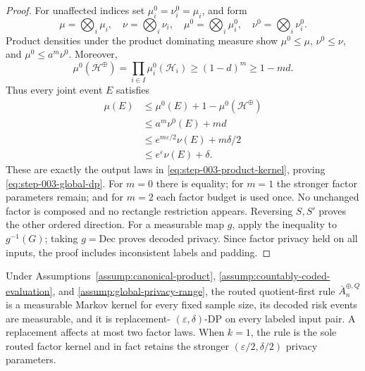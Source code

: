 \begin{proof}
For unaffected indices set \(\mu_i^0=\nu_i^0=\mu_i\), and form
\begin{equation}\label{eq:step-003-product-submeasures}
\mu=\bigotimes_i\mu_i,\quad \nu=\bigotimes_i\nu_i,\quad
\mu^0=\bigotimes_i\mu_i^0,\quad \nu^0=\bigotimes_i\nu_i^0.
\end{equation}
Product densities under the product dominating measure show
\(\mu^0\le\mu\), \(\nu^0\le\nu\), and
\(\mu^0\le a^m\nu^0\).  Moreover,
\begin{equation}\label{eq:step-003-product-retained-mass}
\mu^0(\mathcal H^{\oplus})
=\prod_{i\in I}\mu_i^0(\mathcal H_i)
\ge(1-d)^m\ge1-md.
\end{equation}
Thus every joint event \(E\) satisfies
\begin{equation}\label{eq:step-003-composition-chain}
\begin{split}
\mu(E)
&\le\mu^0(E)+1-\mu^0(\mathcal H^{\oplus})\\
&\le a^m\nu^0(E)+md\\
&\le e^{m\varepsilon/2}\nu(E)+m\delta/2\\
&\le e^\varepsilon\nu(E)+\delta.
\end{split}
\end{equation}
These are exactly the output laws in
\eqref{eq:step-003-product-kernel}, proving
\eqref{eq:step-003-global-dp}.  For \(m=0\) there is equality; for \(m=1\)
the stronger factor parameters remain; and for \(m=2\) each factor budget
is used once.  No unchanged factor is composed and no rectangle restriction
appears.  Reversing \(S,S'\) proves the other ordered direction.  For a
measurable map \(g\), apply the inequality to \(g^{-1}(G)\); taking
\(g=\mathrm{Dec}\) proves decoded privacy.  Since factor privacy held on all
inputs, the proof includes inconsistent labels and padding.
\end{proof}

\begin{proposition}
\label{prop:step-003-global-kernel-certificate}
Under Assumptions~\ref{assump:canonical-product},
\ref{assump:countably-coded-evaluation}, and
\ref{assump:global-privacy-range}, the routed quotient-first rule
\(\bar A_n^{\oplus,Q}\) is a measurable Markov kernel for every fixed
sample size, its decoded risk events are measurable, and it is replacement-
\((\varepsilon,\delta)\)-DP on every labeled input pair.  A replacement
affects at most two factor laws.  When \(k=1\), the rule is the sole routed
factor kernel and in fact retains the stronger
\((\varepsilon/2,\delta/2)\) privacy parameters.
\end{proposition}

